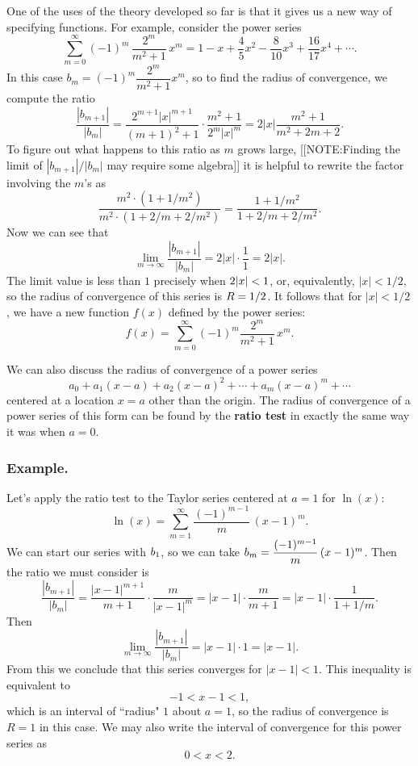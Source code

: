 One of the uses of the theory developed so far is that it gives us a
new way of specifying functions.  For example, consider the power
series
\[
\sum_{m=0}^\infty (-1)^m\,\dfrac{2^m}{m^2+1}\,x^m = 
        1 - x + \dfrac{4}{5} x^2 - \dfrac{8}{10} x^3
        + \dfrac{16}{17} x^4 + \cdots .
\]
In this case $b_m=(-1)^m \dfrac{2^m}{m^2+1}x^m$, so to find the radius
of convergence, we compute the ratio
\[
\dfrac{|b_{m+1}|}{|b_m|} = 
        \dfrac{2^{m+1}|x|^{m+1}}{(m+1)^2 + 1} \cdot 
        \dfrac{m^2 + 1}{2^m |x|^m}  
      = 2|x| \dfrac{m^2 + 1}{m^2 + 2m + 2}.
\]
To figure out what happens to this ratio as $m$ grows large, 
[[NOTE:Finding the limit of $|b_{m+1}|/|b_m|$ may require some algebra]]
it is helpful to rewrite the factor involving the $m$'s as
\[
\dfrac{m^2 \cdot (1 + 1/m^2)}{m^2 \cdot (1+2/m +2/m^2)}
= \dfrac{1 + 1/m^2}{1 + 2/m + 2/m^2}.
\]
Now we can see that
\[
\lim_{m \to \infty} \dfrac{|b_{m+1}|}{|b_m|} 
    = 2 |x| \cdot \dfrac{1}{1} = 2|x|.
\]
The limit value is less than $1$ precisely when $2|x| < 1\/$, or,
equivalently, $|x| < 1/2,$ so the radius of convergence of this series
is $R=1/2\/$.  It follows that for $|x| < 1/2$, we have a new function
$f(x)$ defined by the power series:
\[
f(x) = \sum_{m=0}^\infty (-1)^m \dfrac{2^m}{m^2+1} \,x^m .
\]


We can also discuss the radius of convergence of a power series
\[
a_0 + a_1 (x - a) + a_2 (x - a)^2 + \cdots + a_m (x - a)^m + \cdots 
\]
centered at a location $x = a$ other than the origin.  The radius of
convergence of a power series of this form can be found by the {\bf
ratio test} in exactly the same way it was when $a = 0$.




\subsubsection{Example.}
Let's apply the ratio test to the Taylor series
centered at $a=1$ for $\ln(x)$:
\[
\ln(x) = \sum_{m=1}^\infty \dfrac{(-1)^{m-1}}{m} \, (x-1)^m.
\]
We can start our series with $b_1\/$, so we can take $b_m =
\dfrac{(-1)^{m-1}}{m} \, (x-1)^m\/$.  Then the ratio we must consider
is
\[
\dfrac{|b_{m+1}|}{|b_m|} = \dfrac{|x-1|^{m+1}}{m+1} \cdot \dfrac{m}{|x-1|^m} 
   = |x-1| \cdot \dfrac{m}{m+1} = |x-1| \cdot \dfrac{1}{1 + 1/m}.
\]
Then
\[
\lim_{m \to \infty} \dfrac{|b_{m+1}|}{|b_m|} = |x-1| \cdot 1 = |x-1|.
\]
From this we conclude that this series converges for $|x-1| < 1$.
This inequality is equivalent to
\[
-1 < x-1 < 1,
\] 
which is an interval of ``radius" $1$ about $a=1$, so the radius of
convergence is $R=1$ in this case.  We may also write the interval of
convergence for this power series as
\[
0 < x < 2.
\]

